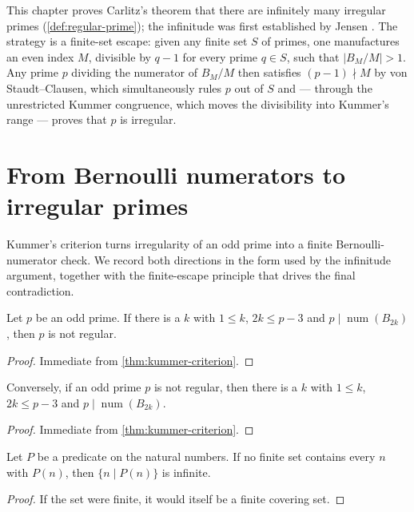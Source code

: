 
This chapter proves Carlitz's theorem \cite{carlitz1954} that there are
infinitely many irregular primes (\cref{def:regular-prime}); the
infinitude was first established by Jensen \cite{jensen1915}.  The
strategy is a finite-set escape: given any finite set $S$ of primes, one
manufactures an even index $M$, divisible by $q-1$ for every prime
$q \in S$, such that $|B_M/M| > 1$.  Any prime $p$ dividing the numerator
of $B_M/M$ then satisfies $(p-1) \nmid M$ by von Staudt--Clausen, which
simultaneously rules $p$ out of $S$ and --- through the unrestricted
Kummer congruence, which moves the divisibility into Kummer's range ---
proves that $p$ is irregular.

\section{From Bernoulli numerators to irregular primes}

Kummer's criterion turns irregularity of an odd prime into a finite
Bernoulli-numerator check.  We record both directions in the form used by the
infinitude argument, together with the finite-escape principle that drives
the final contradiction.

\begin{theorem}\label{thm:irregular-of-bernoulli-witness}
  \leanok
Let $p$ be an odd prime.  If there is a $k$ with $1\le k$, $2k\le p-3$ and
$p\mid\operatorname{num}(B_{2k})$, then $p$ is not regular.
\end{theorem}
\begin{proof}\leanok
Immediate from \cref{thm:kummer-criterion}.
\end{proof}

\begin{theorem}\label{thm:bernoulli-witness-of-irregular}
  \leanok
Conversely, if an odd prime $p$ is not regular, then there is a $k$ with
$1\le k$, $2k\le p-3$ and $p\mid\operatorname{num}(B_{2k})$.
\end{theorem}
\begin{proof}\leanok
Immediate from \cref{thm:kummer-criterion}.
\end{proof}

\begin{lemma}\label{lem:infinite-of-escape}
  \leanok
Let $P$ be a predicate on the natural numbers.  If no finite set contains
every $n$ with $P(n)$, then $\{n \mid P(n)\}$ is infinite.
\end{lemma}
\begin{proof}\leanok
If the set were finite, it would itself be a finite covering set.
\end{proof}

